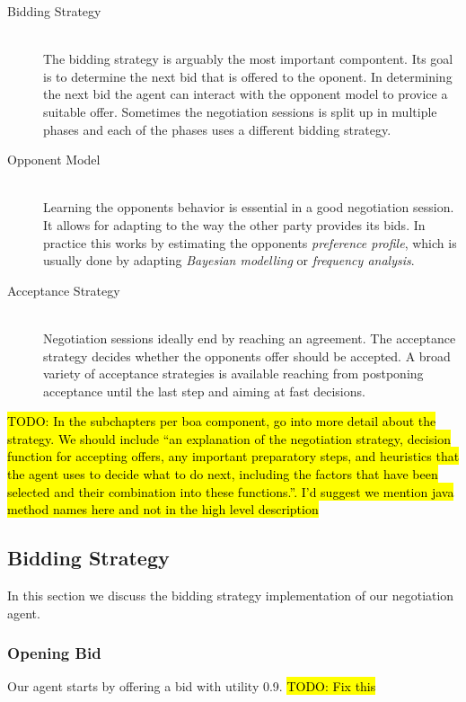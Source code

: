 \documentclass[a4paper,10pt]{article}
\newcommand{\todo}[1] {\hl{TODO: #1}}
\begin{document}
\begin{description}
  \item[Bidding Strategy] \hfill \\
  The bidding strategy is arguably the most important compontent. Its goal is to determine the next bid that is offered to the oponent. In determining the next bid the agent can interact with the opponent model to provice a suitable offer. Sometimes the negotiation sessions is split up in multiple phases and each of the phases uses a different bidding strategy.

  \item[Opponent Model] \hfill \\
  Learning the opponents behavior is essential in a good negotiation session. It allows for adapting to the way the other party provides its bids. In practice this works by estimating the opponents \emph{preference profile}, which is usually done by adapting \emph{Bayesian modelling} or \emph{frequency analysis}.

  \item[Acceptance Strategy] \hfill \\
  Negotiation sessions ideally end by reaching an agreement. The acceptance strategy decides whether the opponents offer should be accepted. A broad variety of acceptance strategies is available reaching from postponing acceptance until the last step and aiming at fast decisions.

\end{description}

\todo{In the subchapters per boa component, go into more detail about the strategy. We should include ``an explanation of the negotiation strategy, decision function for accepting offers, any important preparatory steps, and heuristics that the agent uses to decide what to do next, including the factors that have been selected and their combination into these functions.''.
I'd suggest we mention java method names here and not in the high level description}

\subsection{Bidding Strategy}
\label{sec:strategyBS}
In this section we discuss the bidding strategy implementation of our negotiation agent.

\subsubsection{Opening Bid}
Our agent starts by offering a bid with utility 0.9. \todo{Fix this}
\end{document}
